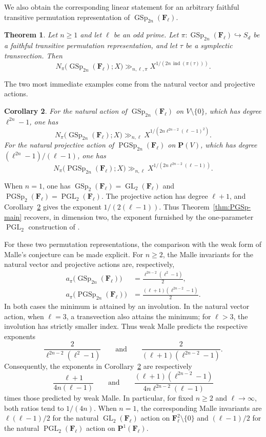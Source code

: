 \documentclass[11pt,hidelinks]{amsart}
\newtheorem{theorem}{Theorem}[section]
\newtheorem{corollary}[theorem]{Corollary}
\newcommand{\F}{\mathbf F}
\newcommand{\GL}{\operatorname{GL}}
\newcommand{\PGL}{\operatorname{PGL}}
\newcommand{\GSp}{\operatorname{GSp}}
\newcommand{\PGSp}{\operatorname{PGSp}}
\newcommand{\ind}{\operatorname{ind}}
\newcommand{\PP}{\mathbf P}
\begin{document}
We also obtain the corresponding linear statement for an arbitrary faithful transitive permutation representation of $\GSp_{2n}(\F_\ell)$.

\begin{theorem}\label{thm:GSp-main}
Let $n\geq 1$ and let $\ell$ be an odd prime. Let
$\pi:\GSp_{2n}(\F_\ell)\hookrightarrow S_d$ be a faithful transitive permutation representation, and let $\tau$ be a symplectic transvection. Then
\[
 N_\pi\bigl(\GSp_{2n}(\F_\ell);X\bigr)
 \gg_{n,\ell,\pi}
 X^{1/(2n\,\ind(\pi(\tau)))}.
\]
\end{theorem}

The two most immediate examples come from the natural vector and projective actions.

\begin{corollary}\label{cor:natural-actions}
For the natural action of $\GSp_{2n}(\F_\ell)$ on $V\setminus\{0\}$, which has degree $\ell^{2n}-1$, one has
\[
 N_\pi\bigl(\GSp_{2n}(\F_\ell);X\bigr)
 \gg_{n,\ell}
 X^{1/(2n\ell^{2n-2}(\ell-1)^2)}.
\]
For the natural projective action of $\PGSp_{2n}(\F_\ell)$ on $\PP(V)$, which has degree $(\ell^{2n}-1)/(\ell-1)$, one has
\[
 N_\pi\bigl(\PGSp_{2n}(\F_\ell);X\bigr)
 \gg_{n,\ell}
 X^{1/(2n\ell^{2n-2}(\ell-1))}.
\]
\end{corollary}

When $n=1$, one has $\GSp_2(\F_\ell)=\GL_2(\F_\ell)$ and $\PGSp_2(\F_\ell)=\PGL_2(\F_\ell)$. The projective action has degree $\ell+1$, and Corollary~\ref{cor:natural-actions} gives the exponent $1/(2(\ell-1))$. Thus Theorem~\ref{thm:PGSp-main} recovers, in dimension two, the exponent furnished by the one-parameter $\PGL_2$ construction of \cite{Cristante2025}.

For these two permutation representations, the comparison with the
weak form of Malle's conjecture can be made explicit.  For $n\geq 2$,
the Malle invariants for the natural vector and projective actions are,
respectively,
\begin{align*}
a_\pi\bigl(\GSp_{2n}(\F_\ell)\bigr)
&=\frac{\ell^{2n-2}(\ell^2-1)}{2},\\
a_\pi\bigl(\PGSp_{2n}(\F_\ell)\bigr)
&=\frac{(\ell+1)(\ell^{2n-2}-1)}{2}.
\end{align*}
In both cases the minimum is attained by an involution. In the natural
vector action, when $\ell=3$, a transvection also attains the minimum;
for $\ell>3$, the involution has strictly smaller index. Thus weak Malle
predicts the respective exponents
\[
\frac{2}{\ell^{2n-2}(\ell^2-1)}
\qquad\text{and}\qquad
\frac{2}{(\ell+1)(\ell^{2n-2}-1)}.
\]
Consequently, the exponents in Corollary~\ref{cor:natural-actions} are
respectively
\[
\frac{\ell+1}{4n(\ell-1)}
\qquad\text{and}\qquad
\frac{(\ell+1)(\ell^{2n-2}-1)}
{4n\ell^{2n-2}(\ell-1)}
\]
times those predicted by weak Malle.  In particular, for fixed
$n\geq2$ and $\ell\to\infty$, both ratios tend to $1/(4n)$.
When $n=1$, the corresponding Malle invariants are
$\ell(\ell-1)/2$ for the natural $\GL_2(\F_\ell)$ action on
$\F_\ell^2\setminus\{0\}$ and $(\ell-1)/2$ for the natural
$\PGL_2(\F_\ell)$ action on $\PP^1(\F_\ell)$.
\end{document}
